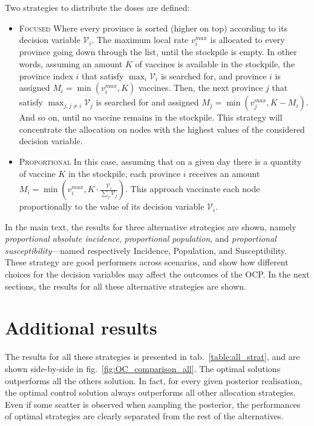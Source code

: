 Two strategies to distribute the doses are defined:
\begin{itemize}
\item \textsc{Focused} Where every province is sorted (higher on top) according to its decision variable $\mathcal{V}_i$. The maximum local rate $v_i^{max}$ is allocated to every province going down through the list, until the stockpile is empty. In other words, assuming an amount $K$ of vaccines is available in the stockpile, the province index $i$ that satisfy $\max_i \mathcal{V}_i$ is searched for, and province $i$ is assigned $M_i = \min(v_i^{max}, K)$ vaccines. Then, the next province $j$ that satisfy $\max_{j,j\neq i} \mathcal{V}_j$ is searched for and assigned $M_j = \min(v_j^{max}, K-M_i)$. And so on, until no vaccine remains in the stockpile. This strategy will concentrate the allocation on nodes with the highest values of the considered decision variable.
\item \textsc{Proportional} In this case, assuming that on a given day there is a quantity of vaccine $K$ in the stockpile, each province $i$ receives an amount $M_i = \min(v_i^{max}, K \cdot \frac{\mathcal{V}_i}{\sum_j \mathcal{V}_j})$. This approach vaccinate each node proportionally to the value of its decision variable $\mathcal{V}_i$.
\end{itemize}
In the main text, the results for three alternative strategies are shown, namely \textit{proportional absolute incidence}, \textit{proportional population}, and \textit{proportional susceptibility}---named respectively Incidence, Population, and Susceptibility. These strategy are good performers across scenarios, and show how different choices for the decision variables may affect the outcomes of the OCP. In the next sections, the results for all these alternative strategies are shown.

\section{Additional results}
The results for all these strategies is presented in tab.~\ref{table:all_strat}, and are shown side-by-side in fig.~\ref{fig:OC_comparison_all}. The optimal solutions outperforms all the others solution. In fact, for every given posterior realisation, the optimal control solution always outperforms all other allocation strategies. Even if some scatter is observed when sampling the posterior, the performances of optimal strategies are clearly separated from the rest of the alternatives.

